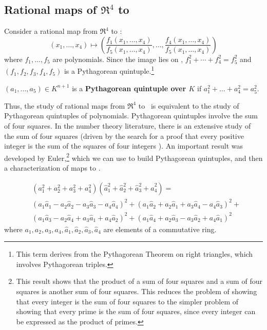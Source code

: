 \documentclass[11pt]{article}
\begin{document}
\subsection{Rational maps of $\Re^4$ to }

Consider a rational map from $\Re^4$ to :
\[
	(x_1,\ldots,x_4) \mapsto
	(\frac{f_1(x_1,\ldots,x_4)}{f_{5}(x_1,\ldots,x_4)}, \ldots,
	 \frac{f_4(x_1,\ldots,x_4)}{f_{5}(x_1,\ldots,x_4)})
\]
where $f_1,\ldots,f_{5}$ are polynomials.
Since the image lies on , $f_1^2 + \cdots + f_4^2 = f_{5}^2$
and $(f_1,f_2,f_3,f_4,f_5)$ is a Pythagorean quintuple.\footnote{This term derives
	from the Pythagorean Theorem on right triangles,
	which involves Pythagorean triples.}
\begin{defn2}
$(a_1,\ldots,a_{5}) \in K^{n+1}$
is a {\bf Pythagorean quintuple over $K$} 
if $a_1^2 + \ldots + a_4^2 = a_5^2$.
\end{defn2}
%
Thus, the study of rational maps from $\Re^{4}$ to \ 
is equivalent to the study of Pythagorean quintuples of polynomials.
Pythagorean quintuples involve the sum of four squares.
In the number theory literature, there is an extensive study of the
sum of four squares (driven by the search for a proof that
every positive integer is the sum of the squares of four integers \cite{dickson52}).
An important result was developed by Euler,\footnote{This result shows that the product of a sum of four squares and a sum of four
	squares is another sum of four squares.
	This reduces the problem of showing that every integer is the sum
	of four squares to the simpler problem
	of showing that every prime is the sum of four squares,
	since every integer can be expressed as the product of primes.}
which we can use to build Pythagorean quintuples, 
and then a characterization of maps to .

\begin{lemma}
\label{lem:euler}
\[
\begin{array}{ll}
& (a_1^2 + a_2^2 + a_3^2 + a_4^2) 
(\hat{a}^2_1 + \hat{a}^2_2 + \hat{a}^2_3 + \hat{a}^2_4) = \\
& (a_1 \hat{a}_1 - a_2\hat{a}_2 - a_3\hat{a}_3 - a_4\hat{a}_4)^2 +
   (a_1\hat{a}_2 + a_2\hat{a}_1 + a_3\hat{a}_4 - a_4\hat{a}_3)^2 + \\
& (a_1\hat{a}_3 - a_2\hat{a}_4 + a_3\hat{a}_1 + a_4\hat{a}_2)^2 +
   (a_1\hat{a}_4 + a_2\hat{a}_3 - a_3\hat{a}_2 + a_4\hat{a}_1)^2
\end{array}
\]
where $a_1,a_2,a_3,a_4,\hat{a}_1,\hat{a}_2,\hat{a}_3,\hat{a}_4$ are elements of a
commutative ring.
\end{lemma}
\end{document}
